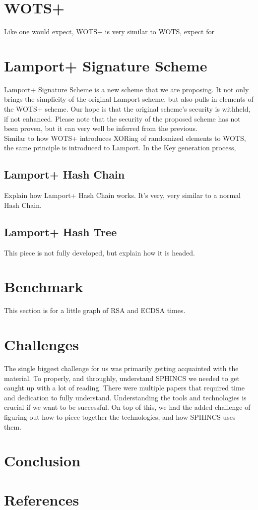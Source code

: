 \documentclass[]{scrartcl}
\begin{document}
\section*{WOTS+}
Like one would expect, WOTS+ is very similar to WOTS, expect for 

\section*{Lamport+ Signature Scheme}
Lamport+ Signature Scheme is a new scheme that we are proposing. It not only brings the simplicity of the original Lamport scheme, but also pulls in elements of the WOTS+ scheme. Our hope is that the original scheme's security is withheld, if not enhanced. Please note that the security of the proposed scheme has not been proven, but it can very well be inferred from the previous.\\
Similar to how WOTS+ introduces XORing of randomized elements to WOTS, the same principle is introduced to Lamport. In the Key generation process, 



\subsection*{Lamport+ Hash Chain}
Explain how Lamport+ Hash Chain works. It's very, very similar to a normal Hash Chain.

\subsection*{Lamport+ Hash Tree}
This piece is not fully developed, but explain how it is headed.

\section*{Benchmark}
This section is for a little graph of RSA and ECDSA times.

\section*{Challenges}
The single biggest challenge for us was primarily getting acquainted with the material. To properly, and throughly, understand SPHINCS we needed to get caught up with a lot of reading. There were multiple papers that required time and dedication to fully understand. Understanding the tools and technologies is crucial if we want to be successful. On top of this, we had the added challenge of figuring out how to piece together the technologies, and how SPHINCS uses them.

\section*{Conclusion}

\section*{References}
\end{document}
